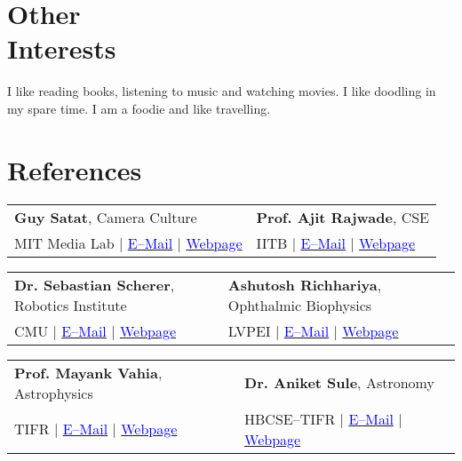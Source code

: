 \documentclass[margin,line]{res}
\begin{document}
\begin{resume}
\section{\sc Other \\Interests}
\lettrine[lines=2]{I}{} like reading books, listening to music and watching movies. I like doodling in my spare time. I am a foodie and like travelling. 

\section{\sc References}
\begin{tabular}{@{}p{3in}p{3in}}
\textbf{Guy Satat}, Camera Culture & \textbf{Prof. Ajit Rajwade}, CSE \\ 
MIT Media Lab $|$ \href{mailto:guysatat@mit.edu}{\textcolor{blue}{E--Mail}} $|$ \href{http://web.media.mit.edu/~guysatat/}{\textcolor{blue}{Webpage}} & IITB $|$ \href{mailto:ajitvr@cse.iitb.ac.in}{\textcolor{blue}{E--Mail}} $|$ \href{https://www.cse.iitb.ac.in/~ajitvr}{\textcolor{blue}{Webpage}} \\
\end{tabular}
\vspace{-0.15in}

\begin{tabular}{@{}p{3in}p{3in}}
\textbf{Dr. Sebastian Scherer}, Robotics Institute & \textbf{Ashutosh Richhariya}, Ophthalmic Biophysics \\ 
CMU $|$ \href{mailto:basti@andrew.cmu.edu}{\textcolor{blue}{E--Mail}} $|$ \href{http://www.ri.cmu.edu/person.html?person_id=1397}{\textcolor{blue}{Webpage}} & LVPEI $|$ \href{mailto:ashutosh@lvpei.org}{\textcolor{blue}{E--Mail}} $|$ \href{http://www.lvpei.org/our-team/our-team-ashutosh.php}{\textcolor{blue}{Webpage}} \\
\end{tabular}
\vspace{-0.15in}

\begin{tabular}{@{}p{3in}p{3in}}
\textbf{Prof. Mayank Vahia}, Astrophysics & \textbf{Dr. Aniket Sule}, Astronomy \\
TIFR $|$ \href{mailto:vahia@tifr.res.in}{\textcolor{blue}{E--Mail}} $|$ \href{http://www.tifr.res.in/~vahia/}{\textcolor{blue}{Webpage}} & HBCSE--TIFR $|$ \href{mailto:anikets@hbcse.tifr.res.in}{\textcolor{blue}{E--Mail}} $|$ \href{http://www.hbcse.tifr.res.in/people/academic/aniket-sule}{\textcolor{blue}{Webpage}} \\
\end{tabular}
\vspace{-0.15in}


\end{resume}
\end{document}
